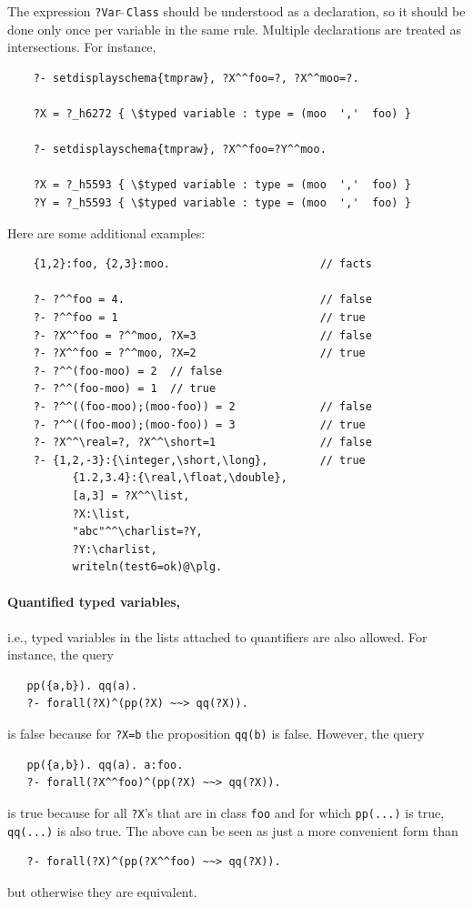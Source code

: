 \documentclass[11pt]{article}
\begin{document}
The expression
\texttt{?Var$\hat{~}\hat{~}$Class} should be understood as a declaration,
so it should be done only once per variable in the same rule.
Multiple declarations are treated as intersections. For instance,
\begin{verbatim}
    ?- setdisplayschema{tmpraw}, ?X^^foo=?, ?X^^moo=?.

    ?X = ?_h6272 { \$typed variable : type = (moo  ','  foo) } 

    ?- setdisplayschema{tmpraw}, ?X^^foo=?Y^^moo.

    ?X = ?_h5593 { \$typed variable : type = (moo  ','  foo) } 
    ?Y = ?_h5593 { \$typed variable : type = (moo  ','  foo) } 
\end{verbatim}

Here are some additional examples:
\begin{verbatim}
    {1,2}:foo, {2,3}:moo.                       // facts

    ?- ?^^foo = 4.                              // false
    ?- ?^^foo = 1                               // true
    ?- ?X^^foo = ?^^moo, ?X=3                   // false
    ?- ?X^^foo = ?^^moo, ?X=2                   // true
    ?- ?^^(foo-moo) = 2  // false
    ?- ?^^(foo-moo) = 1  // true
    ?- ?^^((foo-moo);(moo-foo)) = 2             // false
    ?- ?^^((foo-moo);(moo-foo)) = 3             // true
    ?- ?X^^\real=?, ?X^^\short=1                // false
    ?- {1,2,-3}:{\integer,\short,\long},        // true
          {1.2,3.4}:{\real,\float,\double},
          [a,3] = ?X^^\list,
          ?X:\list,
          "abc"^^\charlist=?Y,
          ?Y:\charlist,
          writeln(test6=ok)@\plg.
\end{verbatim}

\paragraph{Quantified typed variables,} i.e., typed variables in the lists
attached to quantifiers are also allowed. For instance, the query
\begin{verbatim}
   pp({a,b}). qq(a).
   ?- forall(?X)^(pp(?X) ~~> qq(?X)).
\end{verbatim}
is false because for \texttt{?X=b} the proposition \texttt{qq(b)} is false.
However, the query
\begin{verbatim}
   pp({a,b}). qq(a). a:foo.
   ?- forall(?X^^foo)^(pp(?X) ~~> qq(?X)).
\end{verbatim}
is true because for all \texttt{?X}'s that are in class \texttt{foo} and
for which \texttt{pp(...)} is true, \texttt{qq(...)} is also true.  
The above can be seen as just a more convenient form than
\begin{verbatim}
   ?- forall(?X)^(pp(?X^^foo) ~~> qq(?X)).
\end{verbatim}
but otherwise they are equivalent.
\end{document}
